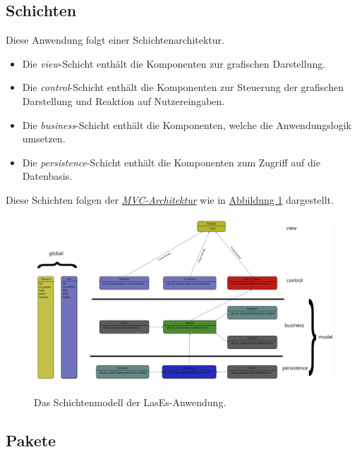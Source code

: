 
\subsection{Schichten}\label{arch:schichten}
Diese Anwendung folgt einer Schichtenarchitektur.
\begin{itemize}
    \item Die \emph{view}-Schicht enthält die Komponenten zur grafischen Darstellung.
    \item Die \emph{control}-Schicht enthält die Komponenten zur Steuerung der grafischen Darstellung und Reaktion auf
    Nutzereingaben.
    \item Die \emph{business}-Schicht enthält die Komponenten, welche die Anwendungslogik umsetzen.
    \item Die \emph{persistence}-Schicht enthält die Komponenten zum Zugriff auf die Datenbasis.
\end{itemize}
Diese Schichten folgen der \emph{\hyperref[arch:mvc]{MVC-Architektur}} wie in \hyperref[arch:pakdia]{Abbildung 1} dargestellt.
\begin{figure}[H]
\centering
    \includegraphics[width=\linewidth]{graphics/Paketdiagramm3.0}\label{arch:pakdia}
    \caption{Das Schichtenmodell der LasEs-Anwendung.}
\end{figure}


\subsection{Pakete}\label{arch:pakete}


